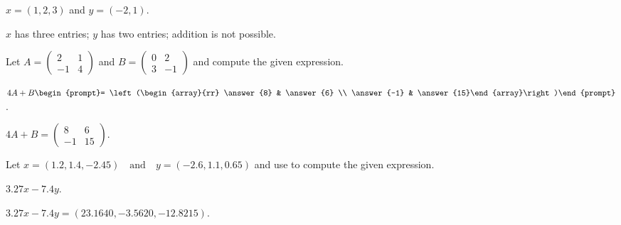 \documentclass{ximera}
\def\mattwo#1#2#3#4{\left(\begin{array}{rr} #1 & #2 \\ #3 & #4\end{array}\right)}
\def\AND{\quad\mbox{and}\quad}
\begin{document}
\begin{exercise}\label{c1.1.3c}
  $x=(1,2,3)$ and $y=(-2,1)$.
  
  \begin{multipleChoice}
  \end{multipleChoice}  

\begin{solution}
$x$ has three entries; $y$ has two entries; addition is not possible.

\end{solution}
\end{exercise}





\problemlabel

\noindent Let $A=\mattwo{2}{1}{-1}{4}$ and $B=\mattwo{0}{2}{3}{-1}$ and compute the given  expression.

\begin{exercise}\label{c1.1.4A}
  $4A+B\begin{prompt}= \mattwo{\answer{8}}{\answer{6}}{\answer{-1}}{\answer{15}}\end{prompt}$.

\begin{solution}
$4A + B = \mattwo{8}{6}{-1}{15}$.


\end{solution}
\end{exercise}





\matlabproblemlabel

\noindent Let  $x=(1.2,1.4,-2.45) \AND y=(-2.6,1.1,0.65)$ and use \Matlab to compute the  given expression.

\begin{computerExercise}  \label{c1.2.3a}
$3.27x-7.4y$.

\begin{solution}
$3.27x - 7.4y = (23.1640, -3.5620, -12.8215)$.

\end{solution}
\end{computerExercise}


\end{document}
